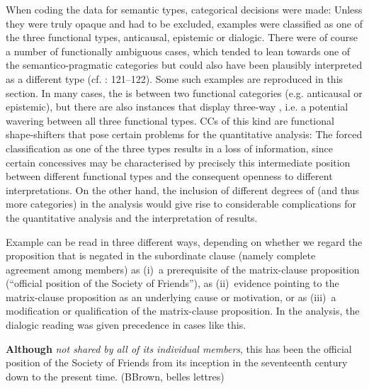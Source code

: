 When coding the data for semantic types, categorical decisions were made: Unless they were truly opaque and had to be excluded, examples were classified as one of the three functional types, anticausal, epistemic or dialogic. There were of course a number of functionally ambiguous cases, which tended to lean towards one of the semantico-pragmatic categories but could also have been plausibly interpreted as a different type (cf. \citealt{Mondorf2004}: 121–122). Some such examples are reproduced in this section. In many cases, the  is between two functional categories (e.g. anticausal or episte\-mic), but there are also instances that display three-way , i.e. a potential wavering between all three functional types. CCs of this kind are functional shape-shifters that pose certain problems for the quantitative analysis: The forced classification as one of the three types results in a loss of information, since certain concessives may be characterised by precisely this intermediate position between different functional types and the consequent openness to different interpretations. On the other hand, the inclusion of different degrees of  (and thus more categories) in the analysis would give rise to considerable complications for the quantitative analysis and the interpretation of results.

  Example  can be read in three different ways, depending on whether we regard the proposition that is negated in the subordinate clause (namely complete agreement among members) as
(i)~a prerequisite of the matrix-clause proposition (“official position of the Society of Friends”), as
(ii)~evidence pointing to the matrix-clause proposition as an underlying cause or motivation, or as
(iii)~a modification or qualification of the matrix-clause proposition. In the analysis, the dialogic reading was given precedence in cases like this.

\ea\label{ex:62}   \label{bkm:Ref488064830}\textbf{Although} \textit{not shared by all of its individual members}, this has been the official position of the Society of Friends from its inception in the seventeenth century down to the present time. (BBrown, belles lettres)
\z

